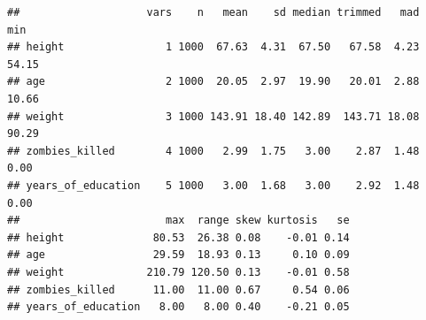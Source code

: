 \documentclass[]{article}
\begin{document}
\begin{verbatim}
##                    vars    n   mean    sd median trimmed   mad   min
## height                1 1000  67.63  4.31  67.50   67.58  4.23 54.15
## age                   2 1000  20.05  2.97  19.90   20.01  2.88 10.66
## weight                3 1000 143.91 18.40 142.89  143.71 18.08 90.29
## zombies_killed        4 1000   2.99  1.75   3.00    2.87  1.48  0.00
## years_of_education    5 1000   3.00  1.68   3.00    2.92  1.48  0.00
##                       max  range skew kurtosis   se
## height              80.53  26.38 0.08    -0.01 0.14
## age                 29.59  18.93 0.13     0.10 0.09
## weight             210.79 120.50 0.13    -0.01 0.58
## zombies_killed      11.00  11.00 0.67     0.54 0.06
## years_of_education   8.00   8.00 0.40    -0.21 0.05
\end{verbatim}
\end{document}
